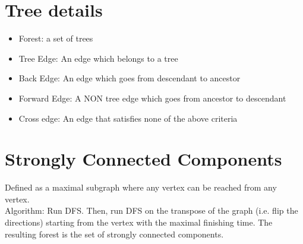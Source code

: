 \documentclass{article}
\begin{document}
	\begin{minipage}{.35\textwidth}
	\end{minipage}

\section*{Tree details}
\begin{itemize}
\item Forest: a set of trees
\item Tree Edge: An edge which belongs to a tree
\item Back Edge: An edge which goes from descendant to ancestor
\item Forward Edge: A NON tree edge which goes from ancestor to descendant
\item Cross edge: An edge that satisfies none of the above criteria 
\end{itemize}
\section*{Strongly Connected Components}
Defined as a maximal subgraph where any vertex can be reached from any vertex. \\

Algorithm: Run DFS. Then, run DFS on the transpose of the graph (i.e. flip the directions) starting from the vertex with the maximal finishing time. The resulting forest is the set of strongly connected components. \\
\end{document}
